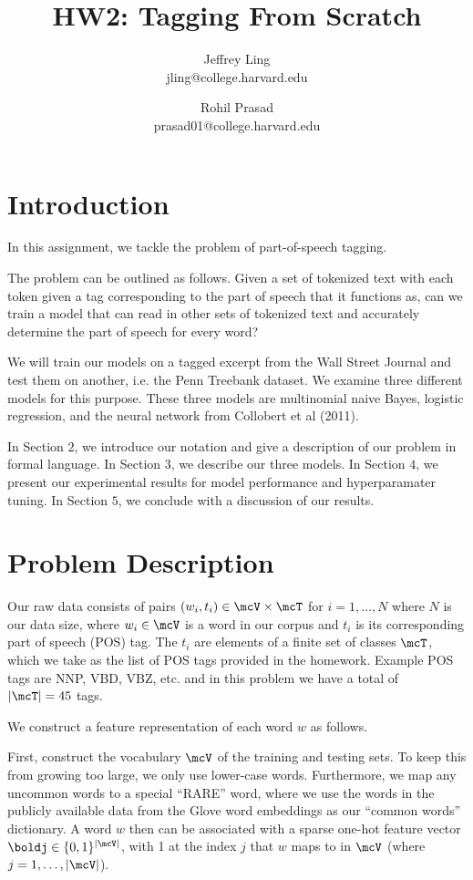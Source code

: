 \documentclass[11pt]{article}
\title{HW2: Tagging From Scratch}
\author{Jeffrey Ling \\ jling@college.harvard.edu \and Rohil Prasad \\ prasad01@college.harvard.edu }
\begin{document}
\maketitle{}
\section{Introduction}

In this assignment, we tackle the problem of part-of-speech tagging. 

The problem can be outlined as follows. Given a set of tokenized text with each token given a tag corresponding to the part of speech that it functions as, can we train a model that can read in other sets of tokenized text and accurately determine the part of speech for every word? 

We will train our models on a tagged excerpt from the Wall Street Journal and test them on another, i.e. the Penn Treebank dataset. We examine three different models for this purpose. These three models are multinomial naive Bayes, logistic regression, and the neural network from Collobert et al (2011).

In Section $2$, we introduce our notation and give a description of our problem in formal language. In Section $3$, we describe our three models. In Section $4$, we present our experimental results for model performance and hyperparamater tuning. In Section $5$, we conclude with a discussion of our results. 

\section{Problem Description}

Our raw data consists of pairs $(w_i, t_i) \in \mcV \times \mcT$ for $i = 1, \ldots, N$ where $N$ is our data size, where $w_i \in \mcV$ is a word in our corpus and $t_i$ is its corresponding part of speech (POS) tag. The $t_i$ are elements of a finite set of classes $\mcT$, which we take as the list of POS tags provided in the homework. Example POS tags are NNP, VBD, VBZ, etc. and in this problem we have a total of $|\mcT| = 45$ tags.

We construct a feature representation of each word $w$ as follows. 

First, construct the vocabulary $\mcV$ of the training and testing sets. To keep this from growing too large, we only use lower-case words. Furthermore, we map any uncommon words to a special ``RARE'' word, where we use the words in the publicly available data from the Glove word embeddings as our ``common words'' dictionary. A word $w$ then can be associated with a sparse one-hot feature vector $\boldj \in \{0,1\}^{|\mcV|}$, with 1 at the index $j$ that $w$ maps to in $\mcV$ (where $j = 1, \ldots, |\mcV|$). 
\end{document}

